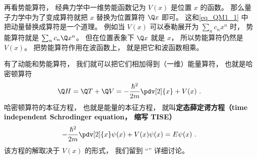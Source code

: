 再看势能算符， 经典力学中一维势能函数记为 $V(x)$ 是位置 $x$ 的函数。 那么量子力学中为了变成算符就把 $x$ 替换为位置算符 $\Q x$ 即可。 这和\autoref{eq_QM1_1} 中把动量替换成算符是一个道理。 例如当 $V(x)$ 可以泰勒展开为 $\sum_n c_n x^n$ 时， 势能算符就是 $\sum_n c_n \Q x^n$。 但在位置表象下 $\Q x$ 就是 $x$， 所以势能算符仍然是 $V(x)$。 把势能算符作用在波函数上， 就是把它和波函数相乘。

有了动能和势能算符， 我们就可以把它们相加得到（一维）能量算符， 也就是哈密顿算符
\begin{equation}
\Q H = \Q T + \Q V = -\frac{\hbar^2}{2m} \pdv[2]{x} + V(x)~.
\end{equation}
哈密顿算符的本征方程， 也就是能量的本征方程， 就叫\textbf{定态薛定谔方程（time independent Schrodinger equation， 缩写 TISE）}
\begin{equation}
-\frac{\hbar^2}{2m} \pdv[2]{x}\psi(x) + V(x)\psi(x) = E\psi(x)~.
\end{equation}
该方程的解取决于 $V(x)$ 的形式， 我们留到 “” 详细讨论。
